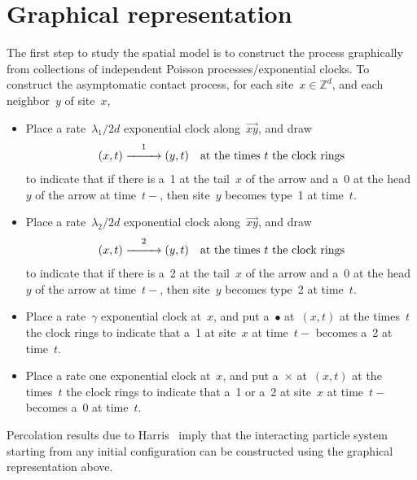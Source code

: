 \documentclass[letterpaper,11pt,twoside,keywordsasfootnote,addressatend,noinfoline]{article}
\newcommand{\Z}{\mathbb{Z}}
\begin{document}
\section{Graphical representation}
\label{sec:GR}
 The first step to study the spatial model is to construct the process graphically from collections of independent Poisson processes/exponential clocks.
 To construct the asymptomatic contact process, for each site~$x \in \Z^d$, and each neighbor~$y$ of site~$x$,
\begin{itemize}
\item
 Place a rate~$\lambda_1 / 2d$ exponential clock along~$\vec{xy}$, and draw
 $$ (x, t) \overset{1}{\xrightarrow{\hspace*{25pt}}} (y, t) \quad \hbox{at the times~$t$ the clock rings} $$
 to indicate that if there is a~1 at the tail~$x$ of the arrow and a~0 at the head~$y$ of the arrow at time~$t-$, then site~$y$ becomes type~1 at time~$t$. \vspace*{5pt}
\item
 Place a rate~$\lambda_2 / 2d$ exponential clock along~$\vec{xy}$, and draw
 $$ (x, t) \overset{2}{\xrightarrow{\hspace*{25pt}}} (y, t) \quad \hbox{at the times~$t$ the clock rings} $$
 to indicate that if there is a~2 at the tail~$x$ of the arrow and a~0 at the head~$y$ of the arrow at time~$t-$, then site~$y$ becomes type~2 at time~$t$. \vspace*{5pt}
\item
 Place a rate~$\gamma$ exponential clock at~$x$, and put a~$\bullet$ at~$(x, t)$ at the times~$t$ the clock rings to indicate that a~1 at site~$x$ at time~$t-$ becomes a~2 at time~$t$. \vspace*{5pt}
\item
 Place a rate one exponential clock at~$x$, and put a~$\times$ at~$(x, t)$ at the times~$t$ the clock rings to indicate that a~1 or a~2 at site~$x$ at time~$t-$ becomes a~0 at time~$t$.
\end{itemize}
 Percolation results due to Harris~\cite{harris_1978} imply that the interacting particle system starting from any initial configuration can be constructed using the graphical representation above.

\end{document}
